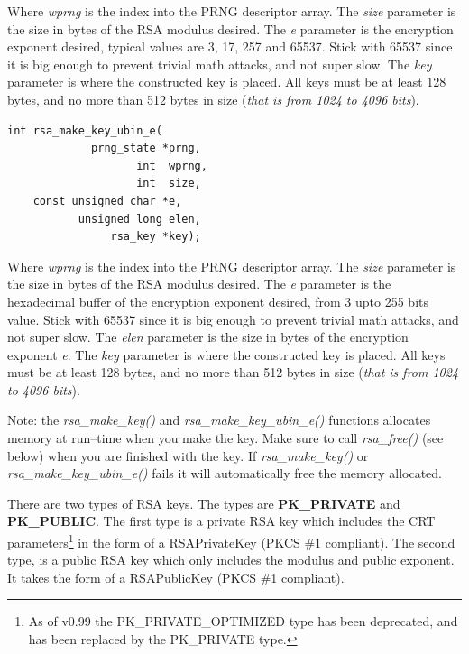 \documentclass[synpaper]{book}
\begin{document}
Where \textit{wprng} is the index into the PRNG descriptor array.  The \textit{size} parameter is the size in bytes of the RSA modulus desired.
The \textit{e} parameter is the encryption exponent desired, typical values are 3, 17, 257 and 65537.  Stick with 65537 since it is big enough to prevent
trivial math attacks, and not super slow.  The \textit{key} parameter is where the constructed key is placed.  All keys must be at
least 128 bytes, and no more than 512 bytes in size (\textit{that is from 1024 to 4096 bits}).

\begin{verbatim}
int rsa_make_key_ubin_e(
             prng_state *prng,
                    int  wprng,
                    int  size,
    const unsigned char *e,
           unsigned long elen,
                rsa_key *key);
\end{verbatim}

Where \textit{wprng} is the index into the PRNG descriptor array.  The \textit{size} parameter is the size in bytes of the RSA modulus desired.
The \textit{e} parameter is the hexadecimal buffer of the encryption exponent desired, from 3 upto 255 bits value.  Stick with 65537 since it is big enough
to prevent trivial math attacks, and not super slow.  The \textit{elen} parameter is the size in bytes of the encryption exponent \textit{e}.
The \textit{key} parameter is where the constructed key is placed.  All keys must be at
least 128 bytes, and no more than 512 bytes in size (\textit{that is from 1024 to 4096 bits}).

Note: the \textit{rsa\_make\_key()} and \textit{rsa\_make\_key\_ubin\_e()} functions allocates memory at run--time when you make the key.
Make sure to call \textit{rsa\_free()} (see below) when you are finished with the key.  If \textit{rsa\_make\_key()} or \textit{rsa\_make\_key\_ubin\_e()}
fails it will automatically free the memory allocated.

 
There are two types of RSA keys.  The types are {\bf PK\_PRIVATE} and {\bf PK\_PUBLIC}.  The first type is a private
RSA key which includes the CRT parameters\footnote{As of v0.99 the PK\_PRIVATE\_OPTIMIZED type has been deprecated, and has been replaced by the
PK\_PRIVATE type.} in the form of a RSAPrivateKey (PKCS \#1 compliant).  The second type, is a public RSA key which only includes the modulus and public exponent.
It takes the form of a RSAPublicKey (PKCS \#1 compliant).
\end{document}
